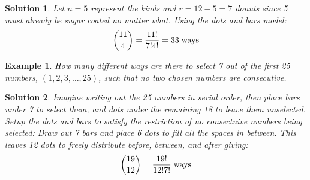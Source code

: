 \documentclass[12pt, letterpaper, onecolumn, conference, final]{IEEEtran}
\theoremstyle{definition}
\theoremstyle{plain}
\newtheorem{example}{Example}[section]
\newtheorem{solution}{Solution}[section]
\begin{document}
\newpage
\begin{solution}
Let $n=5$ represent the kinds and $r=12-5=7$ donuts since 5 must already be sugar coated no matter what. Using the dots and bars model:
\begin{equation*}
{11 \choose 4} = \frac{11!}{7!4!} = 33 \hspace{.1cm} \text{ways}
\end{equation*}
\end{solution}


\begin{example}
How many different ways are there to select 7 out of the first 25 numbers, $(1,2,3,\dots,25)$, such that no two chosen numbers are consecutive.
\end{example}
\begin{solution}
Imagine writing out the 25 numbers in serial order, then place bars under 7 to select them, and dots under the remaining 18 to leave them unselected. Setup the dots and bars to satisfy the restriction of no consectuive numbers being selected: Draw out 7 bars and place 6 dots to fill all the spaces in between. This leaves 12 dots to freely distribute before, between, and after giving:
\begin{equation*}
{19 \choose 12} = \frac{19!}{12!7!} \hspace{.1cm} \text{ways}
\end{equation*}
\end{solution}
\end{document}

